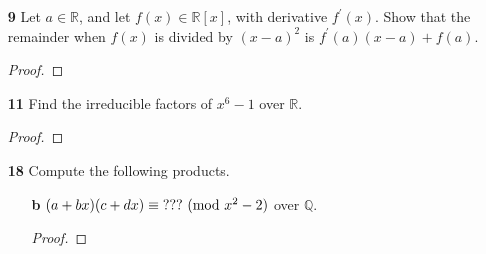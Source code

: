 \documentclass[paper=usletter, fontsize=12pt]{article}
\begin{document}
\begin{enumerate}
\begin{enumerate}
\begin{enumerate}
                \item[\textbf{c}] $f(x) = x^5+4x^4+6x^3+6x^2+5x+2$, \ \ \
                $x^4+3x^2+3x+6$ over $\mathbb{Z}_7$
                \begin{proof}
                \end{proof}

            \end{enumerate}

            \item[\textbf{9}] Let $a \in \mathbb{R}$, and let $f(x)\in
            \mathbb{R}[x]$, with derivative $f^\prime(x)$. Show that the
            remainder when $f(x)$ is divided by $(x-a)^2$ is
            $f^\prime(a)(x-a)+f(a)$.
            \begin{proof}
            \end{proof}

            \item[\textbf{11}] Find the irreducible factors of $x^6-1$ over
            $\mathbb{R}$.
            \begin{proof}
            \end{proof}

            \item[\textbf{18}] Compute the following products.
            \begin{enumerate}

                \item[\textbf{b}] $(a+bx)(c+dx) \equiv \text{???}
                \ (\mathrm{mod}\ x^2-2)$ over $\mathbb{Q}$.
                \begin{proof}
                \end{proof}

            \end{enumerate}

        \end{enumerate}

    \end{enumerate}
\end{document}
